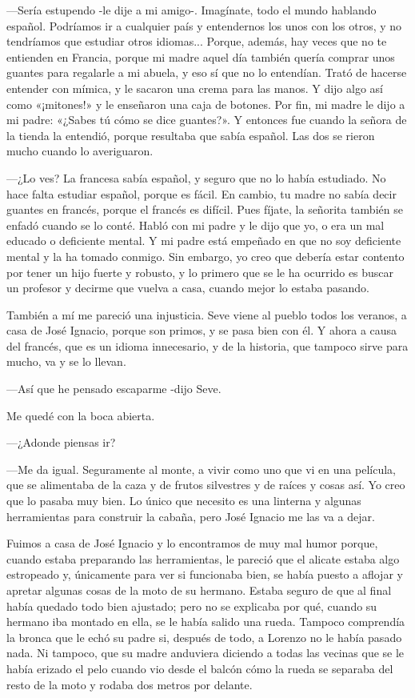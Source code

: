 \documentclass{barcodevapor3pags}
\begin{document}
---Sería estupendo -le dije a mi amigo-. Imagínate, todo el mundo
hablando español. Podríamos ir a cualquier país y entendernos los unos
con los otros, y no tendríamos que estudiar otros idiomas... Porque,
además, hay veces que no te entienden en Francia, porque mi madre aquel
día también quería comprar unos guantes para regalarle a mi abuela, y
eso sí que no lo entendían. Trató de hacerse entender con mímica, y le
sacaron una crema para las manos. Y dijo algo así como «¡mitones!» y le
enseñaron una caja de botones. Por fin, mi madre le dijo a mi padre:
«¿Sabes tú cómo se dice guantes?». Y entonces fue cuando la señora de la
tienda la entendió, porque resultaba que sabía español. Las dos se
rieron mucho cuando lo averiguaron.~

---¿Lo ves? La francesa sabía español, y seguro que no lo había
estudiado. No hace falta estudiar español, porque es fácil. En cambio,
tu madre no sabía decir guantes en francés, porque el francés es
difícil. Pues fíjate, la señorita también se enfadó cuando se lo conté.
Habló con mi padre y le dijo que yo, o era un mal educado o deficiente
mental. Y mi padre está empeñado en que no soy deficiente mental y la ha
tomado conmigo. Sin embargo, yo creo que debería estar contento por
tener un hijo fuerte y robusto, y lo primero que se le ha ocurrido es
buscar un profesor y decirme que vuelva a casa, cuando mejor lo estaba
pasando.~

También a mí me pareció una injusticia. Seve viene al pueblo todos los
veranos, a casa de José Ignacio, porque son primos, y se pasa bien con
él. Y ahora a causa del francés, que es un idioma innecesario, y de la
historia, que tampoco sirve para mucho, va y se lo llevan.~

---Así que he pensado escaparme -dijo Seve.~

Me quedé con la boca abierta.~

---¿Adonde piensas ir?~

---Me da igual. Seguramente al monte, a vivir como uno que vi en una
película, que se alimentaba de la caza y de frutos silvestres y de
raíces y cosas así. Yo creo que lo pasaba muy bien. Lo único que
necesito es una linterna y algunas herramientas para construir la
cabaña, pero José Ignacio me las va a dejar.~

Fuimos a casa de José Ignacio y lo encontramos de muy mal humor porque,
cuando estaba preparando las herramientas, le pareció que el alicate
estaba algo estropeado y, únicamente para ver si funcionaba bien, se
había puesto a aflojar y apretar algunas cosas de la moto de su hermano.
Estaba seguro de que al final había quedado todo bien ajustado; pero no
se explicaba por qué, cuando su hermano iba montado en ella, se le había
salido una rueda. Tampoco comprendía la bronca que le echó su padre si,
después de todo, a Lorenzo no le había pasado nada. Ni tampoco, que su
madre anduviera diciendo a todas las vecinas que se le había erizado el
pelo cuando vio desde el balcón cómo la rueda se separaba del resto de
la moto y rodaba dos metros por delante.~
\end{document}
